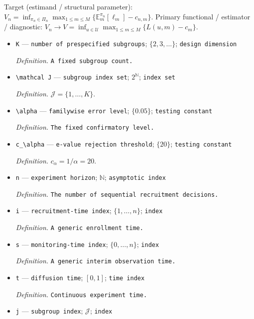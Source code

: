 \documentclass{article}
\begin{document}
Target (estimand / structural parameter): \(V_n=\inf_{\pi_n\in\Pi_n}\max_{1\leq m\leq M}\{\mathbb E_m^{\pi_n}[\ell_m]-c_{n,m}\}\).
Primary functional / estimator / diagnostic: \(V_n\longrightarrow V=\inf_{u\in\mathcal U}\max_{1\leq m\leq M}\{L(u,m)-c_m\}\).
\begin{itemize}
  \item \texttt{K} --- \texttt{number of prespecified subgroups}; \(\{2,3,\ldots\}\); \texttt{design dimension}
  \par\smallskip\noindent\emph{Definition.} \texttt{A fixed subgroup count.}
  \item \texttt{\textbackslash{}\allowbreak{}mathcal J} --- \texttt{subgroup index set}; \(2^{\mathbb N}\); \texttt{index set}
  \par\smallskip\noindent\emph{Definition.} \(\mathcal J=\{1,\ldots,K\}\).
  \item \texttt{\textbackslash{}\allowbreak{}alpha} --- \texttt{familywise error level}; \(\{0.05\}\); \texttt{testing constant}
  \par\smallskip\noindent\emph{Definition.} \texttt{The fixed confirmatory level.}
  \item \texttt{c\_\allowbreak{}\textbackslash{}\allowbreak{}alpha} --- \texttt{e-\allowbreak{}value rejection threshold}; \(\{20\}\); \texttt{testing constant}
  \par\smallskip\noindent\emph{Definition.} \(c_\alpha=1/\alpha=20\).
  \item \texttt{n} --- \texttt{experiment horizon}; \(\mathbb N\); \texttt{asymptotic index}
  \par\smallskip\noindent\emph{Definition.} \texttt{The number of sequential recruitment decisions.}
  \item \texttt{i} --- \texttt{recruitment-\allowbreak{}time index}; \(\{1,\ldots,n\}\); \texttt{index}
  \par\smallskip\noindent\emph{Definition.} \texttt{A generic enrollment time.}
  \item \texttt{s} --- \texttt{monitoring-\allowbreak{}time index}; \(\{0,\ldots,n\}\); \texttt{index}
  \par\smallskip\noindent\emph{Definition.} \texttt{A generic interim observation time.}
  \item \texttt{t} --- \texttt{diffusion time}; \([0,1]\); \texttt{time index}
  \par\smallskip\noindent\emph{Definition.} \texttt{Continuous experiment time.}
  \item \texttt{j} --- \texttt{subgroup index}; \(\mathcal J\); \texttt{index}

\end{itemize}
\end{document}

